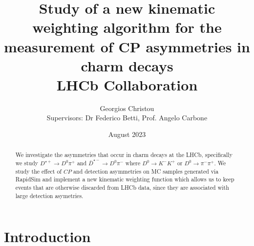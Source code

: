 \documentclass{article}
\title{\textbf{
        Study of a new kinematic weighting algorithm for the measurement of CP asymmetries in charm decays}
        \\
        LHCb Collaboration
}
\author{
        Georgios Christou
        \\
        Supervisors: Dr Federico Betti, Prof. Angelo Carbone
}
\date{
        August 2023
}
\begin{document}
        \begin{figure}[t]
                \centering
                \hspace{1cm}
        \end{figure}

        \maketitle

        \begin{abstract}
                We investigate the asymmetries that occur in charm decays at the LHCb, specifically we study $D^{\star+}\to D^0\pi^+$ and $\bar{D}^{\star-}\to D^0\pi^-$ where $D^0\to K^-K^+$ or $D^0\to \pi^-\pi^+$.
                We study the effect of $CP$ and detection asymmetries on MC samples generated via RapidSim and implement a new kinematic weighting function which allows us to keep events that are otherwise discarded from LHCb data, since they are associated with large detection asymetries.
        \end{abstract}
        
        \pagebreak

        \section{Introduction}
\end{document}
